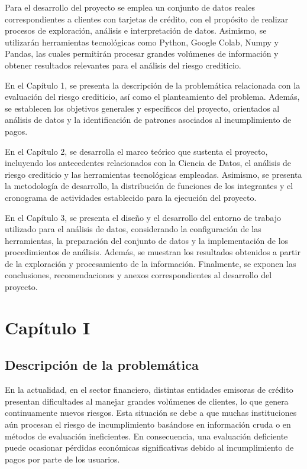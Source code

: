 \documentclass[12pt,a4paper]{article}
\begin{document}
Para el desarrollo del proyecto se emplea un conjunto de datos reales correspondientes a clientes con tarjetas de crédito, con el propósito de realizar procesos de exploración, análisis e interpretación de datos. Asimismo, se utilizarán herramientas tecnológicas como Python, Google Colab, Numpy y Pandas, las cuales permitirán procesar grandes volúmenes de información y obtener resultados relevantes para el análisis del riesgo crediticio.

En el Capítulo 1, se presenta la descripción de la problemática relacionada con la evaluación del riesgo crediticio, así como el planteamiento del problema. Además, se establecen los objetivos generales y específicos del proyecto, orientados al análisis de datos y la identificación de patrones asociados al incumplimiento de pagos.

En el Capítulo 2, se desarrolla el marco teórico que sustenta el proyecto, incluyendo los antecedentes relacionados con la Ciencia de Datos, el análisis de riesgo crediticio y las herramientas tecnológicas empleadas. Asimismo, se presenta la metodología de desarrollo, la distribución de funciones de los integrantes y el cronograma de actividades establecido para la ejecución del proyecto.

En el Capítulo 3, se presenta el diseño y el desarrollo del entorno de trabajo utilizado para el análisis de datos, considerando la configuración de las herramientas, la preparación del conjunto de datos y la implementación de los procedimientos de análisis. Además, se muestran los resultados obtenidos a partir de la exploración y procesamiento de la información. Finalmente, se exponen las conclusiones, recomendaciones y anexos correspondientes al desarrollo del proyecto.


\newpage

\section*{\centering Capítulo I}

\setcounter{section}{1}
\setcounter{subsection}{0}
\subsection{Descripción de la problemática}

En la actualidad, en el sector financiero, distintas entidades emisoras de crédito presentan dificultades al manejar grandes volúmenes de clientes, lo que genera continuamente nuevos riesgos. Esta situación se debe a que muchas instituciones aún procesan el riesgo de incumplimiento basándose en información cruda o en métodos de evaluación ineficientes. En consecuencia, una evaluación deficiente puede ocasionar pérdidas económicas significativas debido al incumplimiento de pagos por parte de los usuarios.
\end{document}
